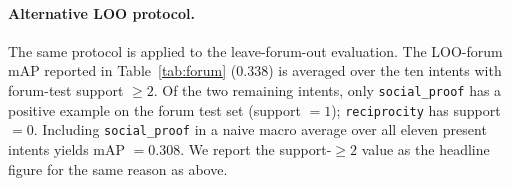 \documentclass[preprint,12pt,authoryear]{elsarticle}
\begin{document}
\paragraph*{Alternative LOO protocol.} The same protocol is applied
to the leave-forum-out evaluation. The LOO-forum mAP reported in
Table~\ref{tab:forum} (0.338) is averaged over the ten intents with
forum-test support $\geq 2$. Of the two remaining intents, only
\texttt{social\_proof} has a positive example on the forum test set
(support $= 1$); \texttt{reciprocity} has support $= 0$. Including
\texttt{social\_proof} in a naive macro average over all eleven
present intents yields mAP $= 0.308$. We report the support-$\geq 2$
value as the headline figure for the same reason as above.

\clearpage
\FloatBarrier


\end{document}
